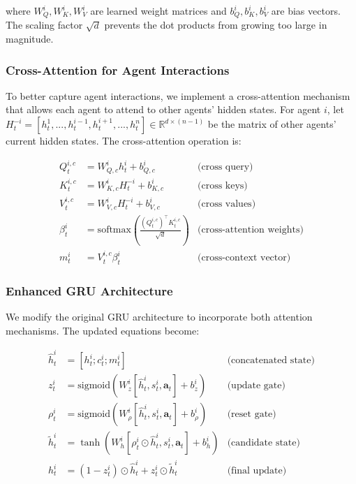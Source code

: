 where $W_Q^i, W_K^i, W_V^i$ are learned weight matrices and $b_Q^i, b_K^i, b_V^i$ are bias vectors. The scaling factor $\sqrt{d}$ prevents the dot products from growing too large in magnitude.

\subsubsection*{Cross-Attention for Agent Interactions}
To better capture agent interactions, we implement a cross-attention mechanism that allows each agent to attend to other agents' hidden states. For agent $i$, let $H_t^{-i} = [h_t^1, ..., h_t^{i-1}, h_t^{i+1}, ..., h_t^n] \in \mathbb{R}^{d \times (n-1)}$ be the matrix of other agents' current hidden states. The cross-attention operation is:

\begin{align*}
Q_t^{i,c} &= W_{Q,c}^i h_t^i + b_{Q,c}^i & \text{(cross query)} \\
K_t^{i,c} &= W_{K,c}^i H_t^{-i} + b_{K,c}^i & \text{(cross keys)} \\
V_t^{i,c} &= W_{V,c}^i H_t^{-i} + b_{V,c}^i & \text{(cross values)} \\
\beta_t^i &= \text{softmax}\left(\frac{(Q_t^{i,c})^\top K_t^{i,c}}{\sqrt{d}}\right) & \text{(cross-attention weights)} \\
m_t^i &= V_t^{i,c} \beta_t^i & \text{(cross-context vector)}
\end{align*}

\subsubsection*{Enhanced GRU Architecture}
We modify the original GRU architecture to incorporate both attention mechanisms. The updated equations become:

\begin{align*}
\hat{h}_t^i &= [h_t^i; c_t^i; m_t^i] & \text{(concatenated state)} \\
z_t^i &= \text{sigmoid}(W_z^i[\hat{h}_t^i, s_t^i, \mathbf{a}_t] + b_z^i) & \text{(update gate)} \\
\rho_t^i &= \text{sigmoid}(W_\rho^i[\hat{h}_t^i, s_t^i, \mathbf{a}_t] + b_\rho^i) & \text{(reset gate)} \\
\tilde{h}_t^i &= \tanh(W_h^i[\rho_t^i \odot \hat{h}_t^i, s_t^i, \mathbf{a}_t] + b_h^i) & \text{(candidate state)} \\
h_t^i &= (1-z_t^i) \odot \hat{h}_t^i + z_t^i \odot \tilde{h}_t^i & \text{(final update)}
\end{align*}


